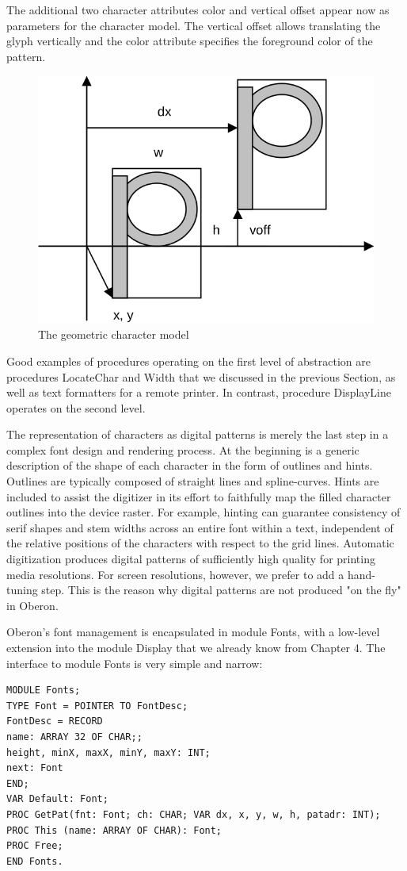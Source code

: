 The additional two character attributes color and vertical offset appear now as parameters for the
character model. The vertical offset allows translating the glyph vertically and the color attribute
specifies the foreground color of the pattern.
\begin{figure}
	\label{fig:character}
	\centering
	\includegraphics[width=.7\textwidth]{i/i}
	\caption{The geometric character model}
\end{figure}

Good examples of procedures operating on the first level of abstraction are procedures LocateChar
and Width that we discussed in the previous Section, as well as text formatters for a remote printer.
In contrast, procedure DisplayLine operates on the second level.

The representation of characters as digital patterns is merely the last step in a complex font design
and rendering process. At the beginning is a generic description of the shape of each character in
the form of outlines and hints. Outlines are typically composed of straight lines and spline-curves.
Hints are included to assist the digitizer in its effort to faithfully map the filled character outlines into
the device raster. For example, hinting can guarantee consistency of serif shapes and stem widths
across an entire font within a text, independent of the relative positions of the characters with
respect to the grid lines. Automatic digitization produces digital patterns of sufficiently high quality
for printing media resolutions. For screen resolutions, however, we prefer to add a hand-tuning
step. This is the reason why digital patterns are not produced "on the fly" in Oberon.

Oberon's font management is encapsulated in module Fonts, with a low-level extension into the
module Display that we already know from Chapter 4. The interface to module Fonts is very simple
and narrow:
\begin{verbatim}
MODULE Fonts;
TYPE Font = POINTER TO FontDesc;
FontDesc = RECORD
name: ARRAY 32 OF CHAR;;
height, minX, maxX, minY, maxY: INT;
next: Font
END;
VAR Default: Font;
PROC GetPat(fnt: Font; ch: CHAR; VAR dx, x, y, w, h, patadr: INT);
PROC This (name: ARRAY OF CHAR): Font;
PROC Free;
END Fonts.
\end{verbatim}

